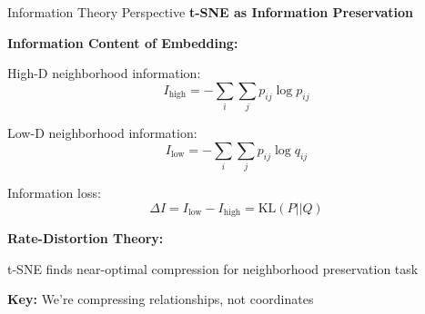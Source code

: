 \documentclass[10pt]{beamer}
\newcommand{\emphtext}[1]{\textcolor{upcblue}{\textbf{#1}}}
\newcommand{\warningbox}[1]{\colorbox{red!10}{\begin{minipage}{0.85\textwidth}\centering #1\end{minipage}}}
\begin{document}
\begin{frame}{Information Theory Perspective}
\emphtext{t-SNE as Information Preservation}

\vspace{0.2cm}
\textbf{Information Content of Embedding:}

High-D neighborhood information:
$$I_{\text{high}} = -\sum_i \sum_j p_{ij} \log p_{ij}$$

Low-D neighborhood information:
$$I_{\text{low}} = -\sum_i \sum_j p_{ij} \log q_{ij}$$

Information loss:
$$\Delta I = I_{\text{low}} - I_{\text{high}} = \text{KL}(P||Q)$$

\vspace{0.2cm}
\textbf{Rate-Distortion Theory:}

\begin{center}
\end{center}

\footnotesize
t-SNE finds near-optimal compression for neighborhood preservation task

\begin{center}
\warningbox{\footnotesize\textbf{Key:} We're compressing relationships, not coordinates}
\end{center}
\end{frame}
\end{document}
